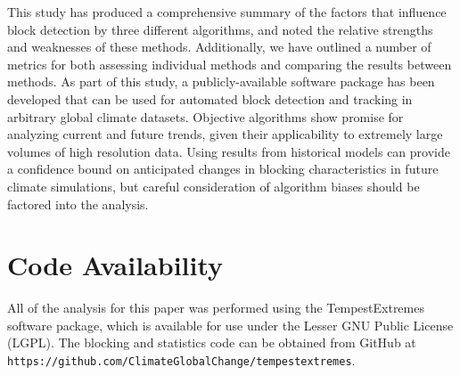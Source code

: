 \documentclass[smallextended]{svjour3}       %
\numberwithin{equation}{section}
\begin{document}
This study has produced a comprehensive summary of the factors that influence block detection by three different algorithms, and noted the relative strengths and weaknesses of these methods.  Additionally, we have outlined a number of metrics for both assessing individual methods and comparing the results between methods. As part of this study, a publicly-available software package has been developed that can be used for automated block detection and tracking in arbitrary global climate datasets.
Objective algorithms show promise for analyzing current and future trends, given their applicability to extremely large volumes of high resolution data. Using results from historical models can provide a confidence bound on anticipated changes in blocking characteristics in future climate simulations, but careful consideration of algorithm biases should be factored into the analysis.

\section{Code Availability}
All of the analysis for this paper was performed using the TempestExtremes software package, which is available for use under the Lesser GNU Public License (LGPL). The blocking and statistics code can be obtained from GitHub at\\ \texttt{https://github.com/ClimateGlobalChange/tempestextremes}.


\end{document}

